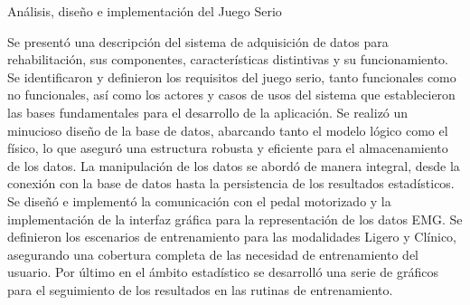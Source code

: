 \begin{thesischapter}{2} {Análisis, diseño e implementación del Juego Serio}

    Se presentó una descripción del sistema de adquisición de datos para rehabilitación, sus componentes,
    características distintivas y su funcionamiento. Se identificaron y definieron los requisitos del juego 
    serio, tanto funcionales como no funcionales, así como los actores y casos de usos del sistema que establecieron 
    las bases fundamentales para el desarrollo de la aplicación. Se realizó un minucioso diseño de la base de datos, 
    abarcando tanto el modelo lógico como el físico, lo que aseguró una estructura robusta y eficiente para el 
    almacenamiento de los datos. La manipulación de los datos se abordó de manera integral, desde la conexión con 
    la base de datos hasta la persistencia de los resultados estadísticos. Se diseñó e implementó la comunicación
    con el pedal motorizado y la implementación de la interfaz gráfica para la representación de los datos EMG. 
    Se definieron los escenarios de entrenamiento para las modalidades Ligero y Clínico, asegurando 
    una cobertura completa de las necesidad de entrenamiento del usuario. Por último en el ámbito estadístico se desarrolló 
    una serie de gráficos para el seguimiento de los resultados en las rutinas de entrenamiento.   
    

\end{thesischapter}